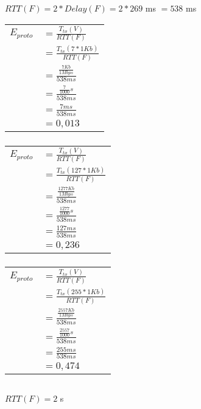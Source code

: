 $RTT(F) = 2 * Delay(F) = 2 * 269$ ms $= 538$ ms

\begin{tabular}{rl}
$E_{proto}$ & $= \frac{T_{tx}(V)}{RTT(F)}$ \\
& $= \frac{T_{tx}(7 * 1Kb)}{RTT(F)}$ \\
& $= \frac{\frac{7Kb}{1Mbps}}{538ms}$ \\
& $= \frac{\frac{7}{1000}s}{538ms}$ \\
& $= \frac{7ms}{538ms}$ \\
& $=0,013$ \\
\end{tabular}

\subsubsection{}
\begin{tabular}{rl}
$E_{proto}$ & $= \frac{T_{tx}(V)}{RTT(F)}$ \\
& $= \frac{T_{tx}(127 * 1Kb)}{RTT(F)}$ \\
& $= \frac{\frac{1277Kb}{1Mbps}}{538ms}$ \\
& $= \frac{\frac{1277}{1000}s}{538ms}$ \\
& $= \frac{127ms}{538ms}$ \\
& $=0,236$ \\
\end{tabular}

\subsubsection{}
\begin{tabular}{rl}
$E_{proto}$ & $= \frac{T_{tx}(V)}{RTT(F)}$ \\
& $= \frac{T_{tx}(255 * 1Kb)}{RTT(F)}$ \\
& $= \frac{\frac{2557Kb}{1Mbps}}{538ms}$ \\
& $= \frac{\frac{2557}{1000}s}{538ms}$ \\
& $= \frac{255ms}{538ms}$ \\
& $=0,474$ \\
\end{tabular}

\subsection{}
\subsubsection{}
$RTT(F) = 2$ s

